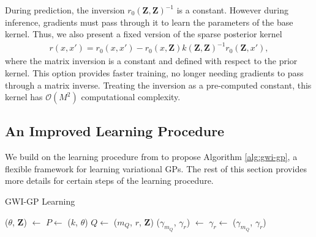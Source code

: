 \documentclass{article}
\numberwithin{equation}{section}
\begin{document}
During prediction, the inversion $r_0\left(\mathbf{Z}, \mathbf{Z}\right)^{-1}$ is a constant. However during inference, gradients must pass through it to learn the parameters of the base kernel. Thus, we also present a fixed version of the sparse posterior kernel
\begin{align}
    r(x, x') = r_0(x, x') - r_0\left(x, \mathbf{Z}\right) k\left(\mathbf{Z}, \mathbf{Z}\right)^{-1} r_0\left(\mathbf{Z}, x'\right),
\end{align}
where the matrix inversion is a constant and defined with respect to the prior kernel. This option provides faster training, no longer needing gradients to pass through a matrix inverse. Treating the inversion as a pre-computed constant, this kernel has $\mathcal{O}(M^2)$ computational complexity.

\subsection{An Improved Learning Procedure}
We build on the learning procedure from \cite{wild2022generalized} to propose Algorithm \ref{alg:gwi-gp}, a flexible framework for learning variational GPs.
The rest of this section provides more details for certain steps of the learning procedure.
\begin{algorithm}[h!]
\caption{GWI-GP Learning}\label{alg:gwi-gp}
\begin{algorithmic}
     
    \State ($\theta$, $\mathbf{Z}$) $\leftarrow$  
    \State $P \leftarrow$ ($k$, $\theta$) 
    \State $Q \leftarrow$ ($m_Q$, $r$, $\mathbf{Z}$) 
    \State ($\gamma_{m_Q}$, $\gamma_r$) $\leftarrow$  
    \State $\gamma_r \leftarrow$  
    \State \Return ($\gamma_{m_Q}$, $\gamma_r$)
\end{algorithmic}
\end{algorithm}
\end{document}
